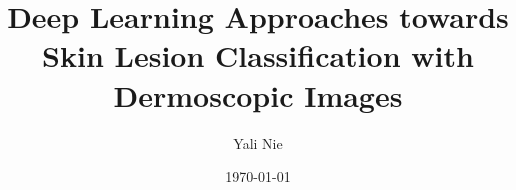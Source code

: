 \title{Deep Learning Approaches towards Skin Lesion Classification with Dermoscopic Images}
\newcommand{\subtitle}{}
\author{Yali Nie}
\date{\today}

\newcommand{\theSupervisor}{Assoc. Prof. Jan Lundgren}
\newcommand{\theSndSupervisor}{Prof. Mattias O’Nils}
\newcommand{\theThesisNumber}{383}
\newcommand{\theISSN}{1652-893X }
\newcommand{\theISBN}{978-91-89341-86-9 } %


\newcommand*{\titleCC}{\begingroup%
\vspace*{3cm}
\noindent \huge \textbf{\thetitle}\\
\Large \subtitle\\

\vspace{1cm}

\noindent \textbf{\theauthor}\\


\vspace{0.5cm}
\noindent \normalsize 
\begin{tabbing}
	Main supervisor: \=\theSupervisor\\
	Co-supervisors: \>\theSndSupervisor
\end{tabbing}


\vspace*{\fill}
\noindent Faculty of Science, Technology and Media\\
Doctoral Thesis in Computer and Electrical Engineering\\
Mid Sweden University\\
Sundsvall, 2023-02-16
\clearpage
\endgroup}


